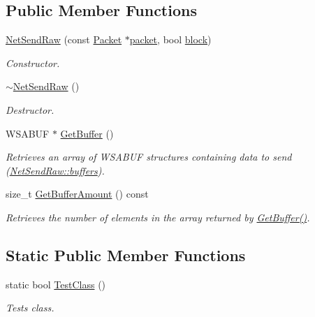 \subsection*{Public Member Functions}
\begin{DoxyCompactItemize}
\item 
\hyperlink{class_net_send_raw_ace4afd9ce85e7ea5cd0bc286e5b68754}{NetSendRaw} (const \hyperlink{class_packet}{Packet} $\ast$\hyperlink{class_net_send_raw_a2b05ae1fabb6e5acd6f5f04d47658258}{packet}, bool \hyperlink{class_net_send_afd9338a4ab3648178d0b5c816a0852d1}{block})
\begin{DoxyCompactList}\small\item\em Constructor. \item\end{DoxyCompactList}\item 
\hypertarget{class_net_send_raw_aca72d7d230af4915a5b6f4ad2ffcafdd}{
\hyperlink{class_net_send_raw_aca72d7d230af4915a5b6f4ad2ffcafdd}{$\sim$NetSendRaw} ()}
\label{class_net_send_raw_aca72d7d230af4915a5b6f4ad2ffcafdd}

\begin{DoxyCompactList}\small\item\em Destructor. \item\end{DoxyCompactList}\item 
WSABUF $\ast$ \hyperlink{class_net_send_raw_ae37be26f84c154728e929f60e6a0b4af}{GetBuffer} ()
\begin{DoxyCompactList}\small\item\em Retrieves an array of WSABUF structures containing data to send (\hyperlink{class_net_send_raw_a65c08b77ebbf2d2e6825d72a55fd5a67}{NetSendRaw::buffers}). \item\end{DoxyCompactList}\item 
size\_\-t \hyperlink{class_net_send_raw_ac4a6e408066cf7d1fd42e730996d0f10}{GetBufferAmount} () const 
\begin{DoxyCompactList}\small\item\em Retrieves the number of elements in the array returned by \hyperlink{class_net_send_raw_ae37be26f84c154728e929f60e6a0b4af}{GetBuffer()}. \item\end{DoxyCompactList}\end{DoxyCompactItemize}
\subsection*{Static Public Member Functions}
\begin{DoxyCompactItemize}
\item 
static bool \hyperlink{class_net_send_raw_a642a07ea5d7f20e9f67e3cf16018742e}{TestClass} ()
\begin{DoxyCompactList}\small\item\em Tests class. \item\end{DoxyCompactList}\end{DoxyCompactItemize}
